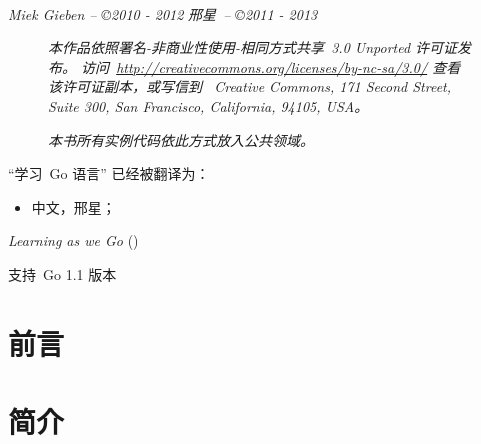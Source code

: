 \documentclass[a4paper,twoside,openleft]{blocksbook}
\begin{document}
\vfill
\begin{center}
    \hspace*{1cm}\\[2.5ex]
    \hspace*{1cm}{\tiny\CcNote{\CcLongnameByNcSa}}
\end{center}
\begin{center}
\hspace*{1cm}\emph{Miek Gieben -- \copyright 2010 - 2012}
\hspace*{1cm}\emph{邢星~-- \copyright 2011 - 2013}
\end{center}
\vspace{-3em}

\newpage

\thispagestyle{empty}
\begin{figure}[H]
\emph{
本作品依照署名-非商业性使用-相同方式共享~3.0 Unported 许可证发布。
访问~\url{http://creativecommons.org/licenses/by-nc-sa/3.0/} 
查看该许可证副本，或写信到~
Creative Commons, 171 Second Street, Suite 300, San Francisco, California, 94105, USA。}    
\vspace{2em}

\emph{本书所有实例代码依此方式放入公共领域。}

\end{figure}

``学习~Go 语言'' 已经被翻译为：
\begin{itemize}
\item 中文，邢星；
\end{itemize}

\begin{center}
\vfill
\emph{Learning as we Go}
(\emph{\version})

\tiny{支持~Go 1.1 版本}
\vspace{.2\stockheight}
\end{center}

\clearpage

\tableofcontents*
\listofex* 
\clearpage

\chapter*{前言}
\label{chap:preface}


\chapter{简介}
\label{chap:intro}

\end{document}
